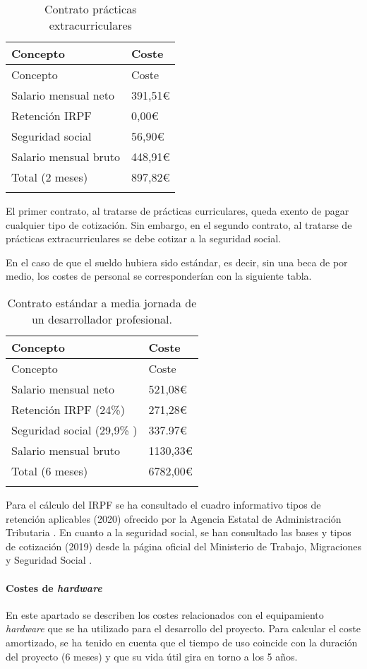 \begin{longtable}[]{@{}ll@{}}
\toprule
Concepto & Coste\tabularnewline
\midrule
\endfirsthead
\toprule
Concepto & Coste\tabularnewline
\midrule
\endhead
Salario mensual neto & 391,51\euro{}\tabularnewline
Retención IRPF & 0,00\euro{}\tabularnewline
Seguridad social & 56,90\euro{}\tabularnewline
Salario mensual bruto & 448,91\euro{}\tabularnewline
Total (2 meses) & 897,82\euro{}\tabularnewline
\bottomrule
\caption{Contrato prácticas extracurriculares}
\end{longtable}

El primer contrato, al tratarse de prácticas curriculares, queda exento
de pagar cualquier tipo de cotización. Sin embargo, en el segundo
contrato, al tratarse de prácticas extracurriculares se debe cotizar a
la seguridad social.

En el caso de que el sueldo hubiera sido estándar, es decir, sin una beca
de por medio, los costes de personal se corresponderían con la siguiente
tabla.

\begin{longtable}[]{@{}ll@{}}
\toprule
Concepto & Coste\tabularnewline
\midrule
\endfirsthead
\toprule
Concepto & Coste\tabularnewline
\midrule
\endhead
Salario mensual neto & 521,08\euro{}\tabularnewline
Retención IRPF (24\%) & 271,28\euro{}\tabularnewline
Seguridad social (29,9\% ) & 337.97\euro{}\tabularnewline
Salario mensual bruto & 1130,33\euro{}\tabularnewline
Total (6 meses) & 6782,00\euro{}\tabularnewline
\bottomrule
\caption{Contrato estándar a media jornada de un desarrollador profesional.}
\end{longtable}

Para el cálculo del IRPF se ha consultado el cuadro informativo tipos
de retención aplicables (2020) ofrecido por la Agencia Estatal de Administración Tributaria \cite{at:irpf}. En cuanto a la seguridad social, se han consultado las 
bases y tipos de cotización (2019) desde la página oficial del Ministerio de Trabajo, Migraciones y Seguridad Social \cite{gob:seg}.


\paragraph{Costes de \emph{hardware}}

En este apartado se describen los costes relacionados con el
equipamiento \emph{hardware} que se ha utilizado para el desarrollo del
proyecto. Para calcular el coste amortizado, se ha tenido en cuenta que
el tiempo de uso coincide con la duración del proyecto (6 meses) y que
su vida útil gira en torno a los 5 años.

